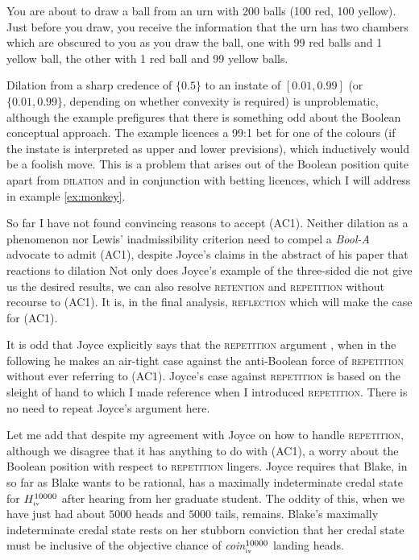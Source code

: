 \documentclass[11pt]{article}
\newcommand{\anderson}[0]{\textit{Bool-A}}
\begin{document}
\begin{quotex}
  \label{ex:urns} You are about to draw a ball
  from an urn with 200 balls (100 red, 100 yellow). Just before you
  draw, you receive the information that the urn has two chambers
  which are obscured to you as you draw the ball, one with 99 red
  balls and 1 yellow ball, the other with 1 red ball and 99 yellow
  balls.
\end{quotex}

Dilation from a sharp credence of $\{0.5\}$ to an instate of
$[0.01,0.99]$ (or $\{0.01,0.99\}$, depending on whether convexity is
required) is unproblematic, although the example prefigures that there
is something odd about the Boolean conceptual approach. The example
licences a 99:1 bet for one of the colours (if the instate is
interpreted as upper and lower previsions), which inductively would be
a foolish move. This is a problem that arises out of the Boolean
position quite apart from \textsc{dilation} and in conjunction with
betting licences, which I will address in example \ref{ex:monkey}.

So far I have not found convincing reasons to accept (AC1). Neither
dilation as a phenomenon nor Lewis' inadmissibility criterion need to
compel a {\anderson} advocate to admit (AC1), despite Joyce's claims
in the abstract of his paper that reactions to dilation  Not only does Joyce's example
of the three-sided die not give us the desired results, we can also
resolve \textsc{retention} and \textsc{repetition} without recourse to
(AC1). It is, in the final analysis, \textsc{reflection} which will
make the case for (AC1).

It is odd that Joyce explicitly says that the \textsc{repetition}
argument  , when in the following he
makes an air-tight case against the anti-Boolean force of
\textsc{repetition} without ever referring to (AC1). Joyce's case
against \textsc{repetition} is based on the sleight of hand to which I
made reference when I introduced \textsc{repetition}. There is no need
to repeat Joyce's argument here.

Let me add that despite my agreement with Joyce on how to handle
\textsc{repetition}, although we disagree that it has anything to do
with (AC1), a worry about the Boolean position with respect to
\textsc{repetition} lingers. Joyce requires that Blake, in so far as
Blake wants to be rational, has a maximally indeterminate credal state
for $H^{10000}_{\mbox{\tiny{iv}}}$ after hearing from her graduate
student. The oddity of this, when we have just had about $5000$ heads
and $5000$ tails, remains. Blake's maximally indeterminate credal
state rests on her stubborn conviction that her credal state must be
inclusive of the objective chance of
\textit{coin}$^{10000}_{\mbox{\tiny{iv}}}$ landing heads.
\end{document}

